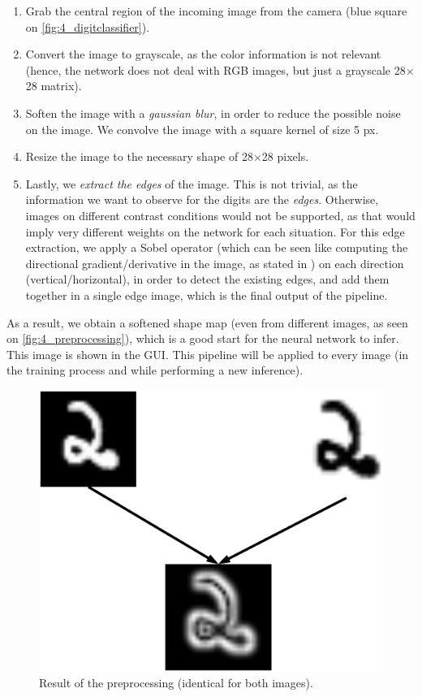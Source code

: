 		\begin{enumerate}
			\item Grab the central region of the incoming image from the camera (blue square on \autoref{fig:4_digitclassifier}).
			
			\item Convert the image to grayscale, as the color information is not relevant (hence, the network does not deal with RGB images, but just a grayscale 28$\times$28 matrix).
			
			\item Soften the image with a \emph{gaussian blur}, in order to reduce the possible noise on the image. We convolve the image with a square kernel of size 5 px.
			
			\item Resize the image to the necessary shape of 28$\times$28 pixels.
			
			\item Lastly, we \emph{extract the edges} of the image. This is not trivial, as the information we want to observe for the digits are the \emph{edges}. Otherwise, images on different contrast conditions would not be supported, as that would imply very different weights on the network for each situation. For this edge extraction, we apply a Sobel operator (which can be seen like computing the directional gradient/derivative in the image, as stated in \cite{sobel}) on each direction (vertical/horizontal), in order to detect the existing edges, and add them together in a single edge image, which is the final output of the pipeline.
		\end{enumerate}
		
		As a result, we obtain a softened shape map (even from different images, as seen on \autoref{fig:4_preprocessing}), which is a good start for the neural network to infer. This image is  shown in the GUI. This pipeline will be applied to every image (in the training process and while performing a new inference).
		
		\begin{figure}[h]
			\centering
			\includegraphics[width=5in]{images/digits_preprocessing}
			\caption{Result of the preprocessing (identical for both images).}
			\label{fig:4_preprocessing}
		\end{figure}

